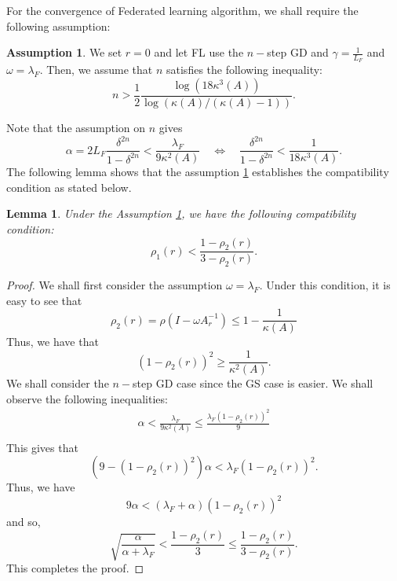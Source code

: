 \documentclass{article}
\newtheorem{lemma}{Lemma}
\theoremstyle{definition}
\newtheorem{assump}[thm]{Assumption}
\begin{document}
For the convergence of Federated learning algorithm, we shall require the following assumption: 
\begin{assump}\label{param}
We set $r = 0$ and let FL use the $n-$step GD and $\gamma = \frac{1}{L_F}$ and 
$\omega =  \lambda_F$. Then, we assume that $n$ satisfies the following inequality: 
\begin{equation}
n > \frac{1}{2} \frac{\log (18 \kappa^3(A))}{\log(\kappa(A)/(\kappa(A)-1))}. 
\end{equation}
\end{assump}
Note that the assumption on $n$ gives
\begin{equation}
\alpha = 2L_F \frac{\delta^{2n}}{1 - \delta^{2n}} < \frac{\lambda_F}{9\kappa^2(A)} \quad \Leftrightarrow \quad \frac{\delta^{2n}}{1 -\delta^{2n}} < \frac{1}{18 \kappa^3(A)}.  
\end{equation} 
The following lemma shows that the assumption \ref{param} establishes the compatibility condition as stated below. 
\begin{lemma}\label{compatibility} 
Under the Assumption \ref{param}, we have the following compatibility condition: 
\begin{equation}
\rho_1(r) < \frac{1 - \rho_2(r)}{3 - \rho_2(r)}.
\end{equation}
\end{lemma}
\begin{proof}
We shall first consider the assumption $\omega = \lambda_F$. Under this condition, it is easy to see that
\begin{equation}
\rho_2(r) = \rho(I - \omega A_r^{-1}) \leq 1 - \frac{1}{\kappa(A)}
\end{equation}
Thus, we have that 
\begin{equation}
(1 - \rho_2(r))^2 \geq \frac{1}{\kappa^{2}(A)}. 
\end{equation}
We shall consider the $n-$step GD case since the GS case is easier. We shall observe the following inequalities: 
\begin{eqnarray*}
\alpha < \frac{\lambda_F}
{9\kappa^2(A)} \leq \frac{ \lambda_F (1 - \rho_2(r))^2}{9} \\
\end{eqnarray*}
This gives that 
\begin{equation}
(9 - (1 - \rho_2(r))^2) \alpha  < \lambda_F ( 1 - \rho_2(r))^2. 
\end{equation}
Thus, we have 
\begin{equation}
9 \alpha < (\lambda_F + \alpha )( 1 - \rho_2(r))^2 
\end{equation}
and so, 
\begin{equation}
\sqrt{\frac{\alpha}{\alpha + \lambda_F}} 
 <  \frac{1 - \rho_2(r)}{3} \leq \frac{1 -\rho_2(r)}{3 - \rho_2(r)}. 
\end{equation}
This completes the proof. 
\end{proof}
\end{document}

